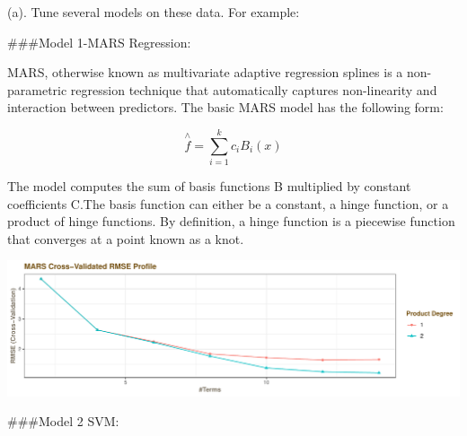 \documentclass[]{report}
\newenvironment{Shaded}{\begin{snugshade}}{\end{snugshade}}
\newcommand{\DataTypeTok}[1]{\textcolor[rgb]{0.13,0.29,0.53}{#1}}
\newcommand{\DecValTok}[1]{\textcolor[rgb]{0.00,0.00,0.81}{#1}}
\newcommand{\KeywordTok}[1]{\textcolor[rgb]{0.13,0.29,0.53}{\textbf{#1}}}
\newcommand{\NormalTok}[1]{#1}
\newcommand{\OperatorTok}[1]{\textcolor[rgb]{0.81,0.36,0.00}{\textbf{#1}}}
\newcommand{\StringTok}[1]{\textcolor[rgb]{0.31,0.60,0.02}{#1}}
\begin{document}
\begin{subquestion}{(a).} Tune several models on these data. For example: 
\end{subquestion}

\begin{Shaded}
\end{Shaded}

\#\#\#Model 1-MARS Regression:

MARS, otherwise known as multivariate adaptive regression splines is a
non-parametric regression technique that automatically captures
non-linearity and interaction between predictors. The basic MARS model
has the following form:

\[
\overset { \wedge  }{ f } =\sum _{ i=1 }^{ k }{ { c }_{ i }{ B }_{ i }(x) } 
\]

The model computes the sum of basis functions B multiplied by constant
coefficients C.The basis function can either be a constant, a hinge
function, or a product of hinge functions. By definition, a hinge
function is a piecewise function that converges at a point known as a
knot.

\includegraphics{Homework-Two_files/figure-latex/kj-7.2-1-1.pdf}

\#\#\#Model 2 SVM:
\end{document}
